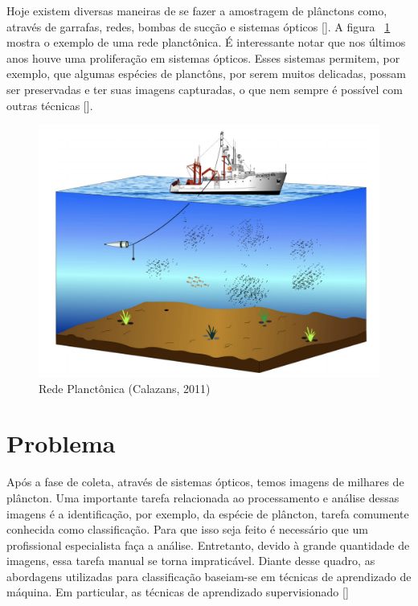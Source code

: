 Hoje existem diversas maneiras de se fazer a amostragem de plânctons como, através de garrafas, redes, bombas de sucção e sistemas ópticos [\cite{calazans2011organismos}]. A figura ~\ref{fig:amostragem_planctons} mostra o exemplo de uma rede planctônica. É interessante notar que nos últimos anos houve uma proliferação em sistemas ópticos. Esses sistemas permitem, por exemplo, que algumas espécies de planctôns, por serem muitos delicadas, possam ser preservadas e ter suas imagens capturadas, o que nem sempre é possível com outras técnicas [\cite{benfield2007rapid}].


\begin{figure}
  \centering
  \includegraphics[width=.8\textwidth]{figures/amostragem_planctons.png}
  \caption{Rede Planctônica (Calazans, 2011)}
  \label{fig:amostragem_planctons}
\end{figure}


\section{Problema}
\label{sec:intro_problema}

Após a fase de coleta, através de sistemas ópticos, temos imagens de milhares de plâncton. Uma importante tarefa relacionada ao processamento e análise dessas imagens é a identificação, por exemplo, da espécie de plâncton, tarefa comumente conhecida como classificação. Para que isso seja feito é necessário que um profissional especialista faça a análise. Entretanto, devido à grande quantidade de imagens, essa tarefa manual se torna impraticável. Diante desse quadro, as abordagens utilizadas para classificação baseiam-se em técnicas de aprendizado de máquina. Em particular, as técnicas de aprendizado supervisionado [\cite{jeffries1980computer, jeffries1984automated, berman1990image, tang1998automatic, luo2003learning, davis2004real, grosjean2004enumeration, luo2005active, hu2005automatic, blaschko2005automatic, hu2006accurate, sosik2007automated, bell2008assessment, soh2008segmentation, al2016plankton, luo2017automated, al2018intelligent}]


